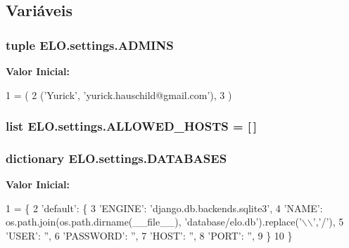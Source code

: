 \subsection{Variáveis}
\hypertarget{namespaceELO_1_1settings_a051220bd8105ba13b2720df11c1950ba}{
\subsubsection[{A\-D\-M\-I\-N\-S}]{\setlength{\rightskip}{0pt plus 5cm}tuple E\-L\-O.\-settings.\-A\-D\-M\-I\-N\-S}}\label{df/d5b/namespaceELO_1_1settings_a051220bd8105ba13b2720df11c1950ba}
{\bfseries Valor Inicial\-:}
\begin{DoxyCode}
1 = (
2     (\textcolor{stringliteral}{'Yurick'}, \textcolor{stringliteral}{'yurick.hauschild@gmail.com'}),
3 )
\end{DoxyCode}
\hypertarget{namespaceELO_1_1settings_afd72644768367440ae1a89e9fe95cde5}{
\subsubsection[{A\-L\-L\-O\-W\-E\-D\-\_\-\-H\-O\-S\-T\-S}]{\setlength{\rightskip}{0pt plus 5cm}list E\-L\-O.\-settings.\-A\-L\-L\-O\-W\-E\-D\-\_\-\-H\-O\-S\-T\-S = \mbox{[}$\,$\mbox{]}}}\label{df/d5b/namespaceELO_1_1settings_afd72644768367440ae1a89e9fe95cde5}
\hypertarget{namespaceELO_1_1settings_a91ed1425b7f1cf041960832ce5b54b6e}{
\subsubsection[{D\-A\-T\-A\-B\-A\-S\-E\-S}]{\setlength{\rightskip}{0pt plus 5cm}dictionary E\-L\-O.\-settings.\-D\-A\-T\-A\-B\-A\-S\-E\-S}}\label{df/d5b/namespaceELO_1_1settings_a91ed1425b7f1cf041960832ce5b54b6e}
{\bfseries Valor Inicial\-:}
\begin{DoxyCode}
1 = \{
2     \textcolor{stringliteral}{'default'}: \{
3         \textcolor{stringliteral}{'ENGINE'}: \textcolor{stringliteral}{'django.db.backends.sqlite3'}, 
4         \textcolor{stringliteral}{'NAME'}: os.path.join(os.path.dirname(\_\_file\_\_), \textcolor{stringliteral}{'database/elo.db'}).replace(\textcolor{stringliteral}{'\(\backslash\)\(\backslash\)'},\textcolor{stringliteral}{'/'}),
5         \textcolor{stringliteral}{'USER'}: \textcolor{stringliteral}{''},
6         \textcolor{stringliteral}{'PASSWORD'}: \textcolor{stringliteral}{''},
7         \textcolor{stringliteral}{'HOST'}: \textcolor{stringliteral}{''},
8         \textcolor{stringliteral}{'PORT'}: \textcolor{stringliteral}{''},
9     \}
10 \}
\end{DoxyCode}
